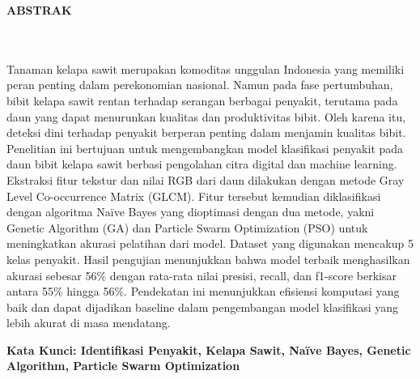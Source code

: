 \clearpage
{}%
\thispagestyle{fancy}

\begin{center}
	\large \bfseries \MakeUppercase{Abstrak}\\
	\normalsize \normalfont {\thetitle}\\
	\normalsize \normalfont {\theauthor}\\
	\bigskip
	
	\normalsize \normalfont \justifying \singlespacing
	Tanaman kelapa sawit merupakan komoditas unggulan Indonesia yang memiliki peran penting dalam perekonomian nasional. Namun pada fase pertumbuhan, bibit kelapa sawit rentan terhadap  serangan berbagai penyakit, terutama pada daun yang dapat menurunkan kualitas dan produktivitas bibit. Oleh karena itu, deteksi dini terhadap penyakit berperan penting dalam menjamin kualitas bibit. Penelitian ini bertujuan untuk mengembangkan model klasifikasi penyakit pada daun bibit kelapa sawit berbasi pengolahan citra digital dan machine learning. Ekstraksi fitur tekstur dan nilai RGB dari daun dilakukan dengan metode Gray Level Co-occurrence Matrix (GLCM). Fitur tersebut kemudian diklasifikasi dengan algoritma Naïve Bayes yang dioptimasi dengan dua metode, yakni Genetic Algorithm (GA) dan Particle Swarm Optimization (PSO) untuk meningkatkan akurasi pelatihan dari model. Dataset yang digunakan mencakup 5 kelas penyakit. Hasil pengujian menunjukkan bahwa model terbaik menghasilkan akurasi sebesar 56\% dengan rata-rata nilai presisi, recall, dan f1-score berkisar antara 55\% hingga 56\%. Pendekatan ini menunjukkan efisiensi komputasi yang baik dan dapat dijadikan baseline dalam pengembangan model klasifikasi yang lebih akurat di masa mendatang.

	
	\textbf{Kata Kunci:  Identifikasi Penyakit, Kelapa Sawit, Naïve Bayes, Genetic Algorithm, Particle Swarm Optimization
}
	
	\vfill
	
\end{center}
\clearpage
